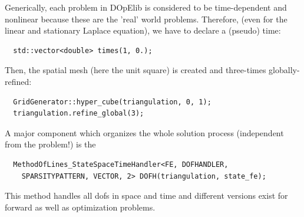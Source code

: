 \documentclass[prodmode,acmtoms]{acmsmall}
\numberwithin{equation}{section}
\begin{document}
Generically, each problem in DOpElib is considered to be time-dependent and nonlinear because
these are the 'real' world problems. Therefore, (even for the linear and stationary Laplace equation),
we have to declare a (pseudo) time:
\begin{lstlisting}
  std::vector<double> times(1, 0.);
\end{lstlisting}
Then, the spatial mesh (here the unit square) is created and three-times globally-refined:
\begin{lstlisting}
  GridGenerator::hyper_cube(triangulation, 0, 1);
  triangulation.refine_global(3);
\end{lstlisting}
A major component which organizes the whole solution process (independent from 
the problem!) is the 
\begin{lstlisting}
  MethodOfLines_StateSpaceTimeHandler<FE, DOFHANDLER, 
    SPARSITYPATTERN, VECTOR, 2> DOFH(triangulation, state_fe);
\end{lstlisting}
This method handles all dofs in space and time and different versions exist
for forward as well as optimization problems.
\end{document}
